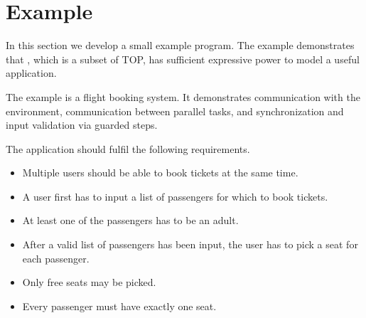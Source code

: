 
\section{Example}

In this section we develop a small example program.
The example demonstrates that \TOPHAT, which is a subset of TOP, has sufficient expressive power to model a useful application.

The example is a flight booking system.
It demonstrates communication with the environment, communication between parallel tasks, and synchronization and input validation via guarded steps.

The application should fulfil the following requirements.
\begin{itemize}
\item Multiple users should be able to book tickets at the same time.
\item A user first has to input a list of passengers for which to book tickets.
\item At least one of the passengers has to be an adult.
\item After a valid list of passengers has been input, the user has to pick a seat for each passenger.
\item Only free seats may be picked.
\item Every passenger must have exactly one seat.
\end{itemize}
